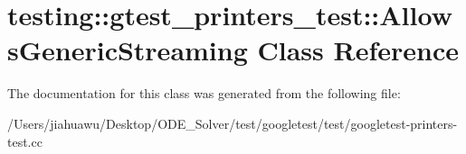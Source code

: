 \hypertarget{classtesting_1_1gtest__printers__test_1_1_allows_generic_streaming}{}\section{testing\+:\+:gtest\+\_\+printers\+\_\+test\+:\+:Allows\+Generic\+Streaming Class Reference}
\label{classtesting_1_1gtest__printers__test_1_1_allows_generic_streaming}


The documentation for this class was generated from the following file\+:\begin{DoxyCompactItemize}
\item 
/\+Users/jiahuawu/\+Desktop/\+O\+D\+E\+\_\+\+Solver/test/googletest/test/googletest-\/printers-\/test.\+cc\end{DoxyCompactItemize}
